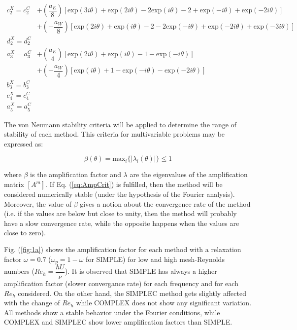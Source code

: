 \documentclass[final,3p,times,10pt,onecolumn]{myElsarticle}
\numberwithin{equation}{section}
\begin{document}
\begin{equation}
\begin{split}
     c^X_2 = c_2^C &+ \left(\dfrac{a_E}{8}\right) \left[\text{exp} (3 i \theta) + \text{exp} (2 i \theta) - 2 \text{exp} (i \theta) - 2 + \text{exp} (-i \theta) + \text{exp} (-2 i \theta)\right] \\
     &+ \left(-\dfrac{a_W}{8}\right) \left[\text{exp} (2 i \theta) + \text{exp} (i \theta) - 2 - 2 \text{exp} (-i \theta) + \text{exp} (-2 i \theta) + \text{exp} (-3 i \theta)\right] \\
     d^X_2 = d^C_2& \\
     a^X_3 = a^C_3 &+ \left(\dfrac{a_E}{4}\right) \left[\text{exp} (2 i \theta) + \text{exp} (i \theta) - 1 - \text{exp} (-i \theta) \right] \\
     &+ \left(-\dfrac{a_W}{4}\right) \left[\text{exp} (i \theta) + 1 - \text{exp} (- i \theta) - \text{exp} (-2 i \theta) \right] \\
     b^X_3 = b_3^C& \\ 
     c^X_4 = c^C_4& \\
     a^X_5 = a^C_5&     
\end{split}
\end{equation}

The von Neumann stability criteria \cite{hirsch} will be applied to determine the range of stability of each method. This criteria for multivariable problems may be expressed as:

\begin{equation}
\beta(\theta) = \text{max}_i \{ |\lambda_i(\theta)| \} \leq 1
\label{eq:AmpCrit}
\end{equation}

\noindent where $\beta$ is the amplification factor and $\lambda$ are the eigenvalues of the amplification matrix $[A^m]$. If Eq. (\ref{eq:AmpCrit}) is fulfilled, then the method will be considered numerically stable (under the hypothesis of the Fourier analysis). Moreover, the value of $\beta$ gives a notion about the convergence rate of the method (i.e. if the values are below but close to unity, then the method will probably have a slow convergence rate, while the opposite happens when the values are close to zero).

Fig. (\ref{fig:1a}) shows the amplification factor for each method with a relaxation factor $\omega=0.7$ ($\omega_p=1-\omega$ for SIMPLE) for low and high mesh-Reynolds numbers ($Re_h = \dfrac{h U}{\nu}$). It is observed that SIMPLE has always a higher amplification factor (slower convergance rate) for each frequency and for each $Re_h$ considered. On the other hand, the SIMPLEC method gets slightly affected with the change of $Re_h$ while COMPLEX does not show any significant variation. All methods show a stable behavior under the Fourier conditions, while COMPLEX and SIMPLEC show lower amplification factors than SIMPLE. 
\end{document}
